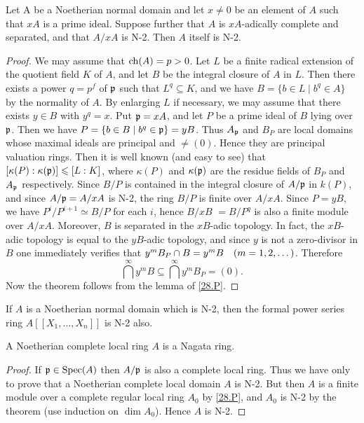 \documentclass[../main]{subfiles}
\begin{document}
\begin{partheorem}[Tate]\label{thm:069} Let A be a Noetherian normal domain and let $x \neq 0$ be an element of $A$ such that $x A$ is a prime ideal. Suppose further that $A$ is $xA$-adically complete and separated, and that $A / x A$ is N-2. Then $A$ itself is N-2.
\end{partheorem}
\begin{proof} We may assume that $\operatorname{ch}(A)=p>0$. Let $L$ be a finite radical extension of the quotient field $K$ of $A$, and let $B$ be the integral closure of $A$ in $L$. Then there exists a power $q=p^f$ of $\mathfrak{p}$ such that $L^q \subseteq K$, and we have $B=\{b \in L \mid b^q \in A\}$ by the normality of $A$. By enlarging $L$ if necessary, we may assume that there exists $y \in B$ with $y^q=x$. Put $\mathfrak{p}=x A$, and let $P$ be a prime ideal of $B$ lying over $\mathfrak{p}$. Then we have $P=\{b \in B \mid b^q \in \mathfrak{p}\}=y B$. Thus $A_{\mathfrak{p}}$ and $B_P$ are local domains whose maximal ideals are principal and $\neq (0)$. Hence they are principal valuation rings. Then it is well known (and easy to see) that $[\kappa(P): \kappa(\mathfrak{p})] \leqslant[L: K]$, where $\kappa(P)$ and $\kappa(\mathfrak{p})$ are the residue fields of $B_P$ and $A_{\mathfrak{p}}$ respectively. Since $B / P$ is contained in the integral closure of $A / \mathfrak{p}$ in $k(P)$, and since $A / \mathfrak{p}=A / x A$ is N-2, the ring $B / P$ is finite over $A / x A$. Since $P=y B$, we have $P^i / P^{i+1} \simeq B / P$ for each $i$, hence $B / x B$ $=B / P^q$ is also a finite module over $A / x A$. Moreover, $B$ is separated in the $x B$-adic topology. In fact, the $x B$-adic topology is equal to the $yB$-adic topology, and since $y$ is not a zero-divisor in $B$ one immediately verifies that $y^m B_P \cap B=y^m B\for{m=1,2, \ldots}$. Therefore \[\bigcap^{\infty} y^mB \subseteq \bigcap^{\infty} y^mB_P=(0).\] Now the theorem follows from the lemma of \ref{28.P}.\end{proof}
\begin{corollary}
If $A$ is a Noetherian normal domain which is N-2, then the formal power series ring $A[[X_1, \ldots, X_n]]$ is N-2 also.
\end{corollary}
\begin{corollary}[Nagata]
 A Noetherian complete local ring $A$ is a Nagata ring.
\end{corollary}
\begin{proof}
If $\mathfrak{p} \in \operatorname{Spec}(A)$ then $A / \mathfrak{p}$ is also a complete local ring. Thus we have only to prove that a Noetherian complete local domain $A$ is N-2. But then $A$ is a finite module over a complete regular local ring $A_0$ by \ref{28.P}, and $A_0$ is N-2 by the theorem (use induction on $\dim A_0$). Hence $A$ is N-2.
\end{proof}
\end{document}
